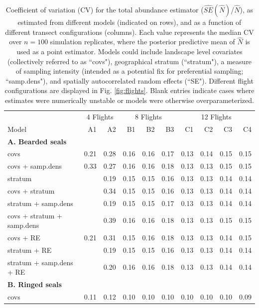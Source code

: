 \documentclass[]{rsos}%
\begin{document}
{\begin{table}[ht]
\caption{Coefficient of variation (CV) for the total abundance estimator ($\hat{SE}(\hat{N})$/$\hat{N}$), as estimated from different models (indicated on rows), and as a function of different transect configurations (columns).  Each value represents the median CV over $n=100$ simulation replicates, where the posterior predictive mean of $\hat{N}$ is used as a point estimator.  Models could include landscape level covariates (collectively referred to as ``covs"), geographical stratum (``stratum"), a measure of sampling intensity (intended as a potential fix for preferential sampling; ``samp.dens"), and spatially autocorrelated random effects (``SE").  Different flight configurations are displayed in Fig. \ref{fig:flights}.  Blank entries indicate cases where estimates were numerically unstable or models were otherwise overparameterized.
}
\label{tab:CV}
\centering
\begin{tabular}{lrrrrrrrrr}
  \hline
   & \multicolumn{2}{c}{4 Flights} & \multicolumn{3}{c}{8 Flights} & \multicolumn{4}{c}{12 Flights} \\
   \cmidrule(lr){2-3} \cmidrule(lr){4-6} \cmidrule(lr){7-10}
Model & A1 & A2 & B1 & B2 & B3 & C1 & C2 & C3 & C4 \\
  \hline
  {\bf A. Bearded seals} & & & & & & & & & \\
covs & 0.21 & 0.28 & 0.16 & 0.16 & 0.17 & 0.13 & 0.14 & 0.15 & 0.15 \\
  covs + samp.dens & 0.33 & 0.27 & 0.16 & 0.16 & 0.18 & 0.13 & 0.13 & 0.15 & 0.15 \\
  stratum &  & 0.19 & 0.15 & 0.15 & 0.16 & 0.13 & 0.13 & 0.14 & 0.14 \\
  covs + stratum &  & 0.34 & 0.15 & 0.15 & 0.16 & 0.13 & 0.13 & 0.14 & 0.14 \\
  stratum + samp.dens &  & 0.19 & 0.15 & 0.15 & 0.17 & 0.13 & 0.13 & 0.14 & 0.14 \\
  covs + stratum + samp.dens &  & 0.39 & 0.16 & 0.16 & 0.18 & 0.13 & 0.13 & 0.15 & 0.15 \\
  covs + RE & 0.21 & 0.31 & 0.15 & 0.16 & 0.18 & 0.13 & 0.13 & 0.14 & 0.15 \\
  stratum + RE &  & 0.19 & 0.15 & 0.15 & 0.16 & 0.13 & 0.13 & 0.14 & 0.14 \\
  stratum + samp.dens + RE &  & 0.20 & 0.16 & 0.16 & 0.18 & 0.13 & 0.13 & 0.14 & 0.14 \\  {\bf B. Ringed seals} & & & & & & & & & \\
  covs & 0.11 & 0.12 & 0.10 & 0.10 & 0.10 & 0.10 & 0.10 & 0.10 & 0.09 \\

\end{tabular}
\end{table}}
\end{document}
